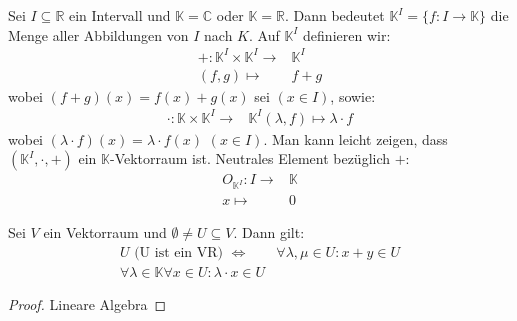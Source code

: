 \begin{Bemerkung}{
	Sei $I \subseteq \mathbb{R}$ ein Intervall und $\mathbb{K} = \mathbb{C}$ oder
	$\mathbb{K} = \mathbb{R}$. Dann bedeutet $\mathbb{K}^I = \{f: I \rightarrow 
	\mathbb{K}\}$ die Menge aller Abbildungen von $I$ nach $K$. Auf $\mathbb{K}^I$ 
	definieren wir:
	\begin{align*}
		+ : \mathbb{K}^I \times \mathbb{K}^I \rightarrow & \mathbb{K}^I \\
		(f,g) \mapsto & f + g
	\end{align*}
	wobei $(f+g)(x) = f(x)+g(x)$ sei $(x \in I)$, sowie:
	\begin{align*}
		\cdot : \mathbb{K} \times \mathbb{K}^I \rightarrow & \mathbb{K}^I
		(\lambda, f) \mapsto \lambda \cdot f
	\end{align*}
	wobei $(\lambda \cdot f)(x) = \lambda \cdot f(x)$ $(x \in I)$.
	Man kann leicht zeigen, dass $(\mathbb{K}^I, \cdot, +)$ ein 
	$\mathbb{K}$-Vektorraum ist. Neutrales Element bezüglich $+$:
	\begin{align*}
		O_{\mathbb{K}^I} : I \rightarrow & \mathbb{K} \\
		x \mapsto & 0
	\end{align*}
}\end{Bemerkung}

\begin{Satz*}{
	Sei $V$ ein Vektorraum und $\emptyset \neq U \subseteq V$. Dann gilt:
	\begin{align*}
		U \text{ (U ist ein VR) } \Leftrightarrow &
		\forall \lambda, \mu \in U : x + y \in U \\
		\forall \lambda \in \mathbb{K} \forall x \in U: \lambda \cdot x \in U
	\end{align*}
}\end{Satz*}
\begin{proof}
	Lineare Algebra
\end{proof}

